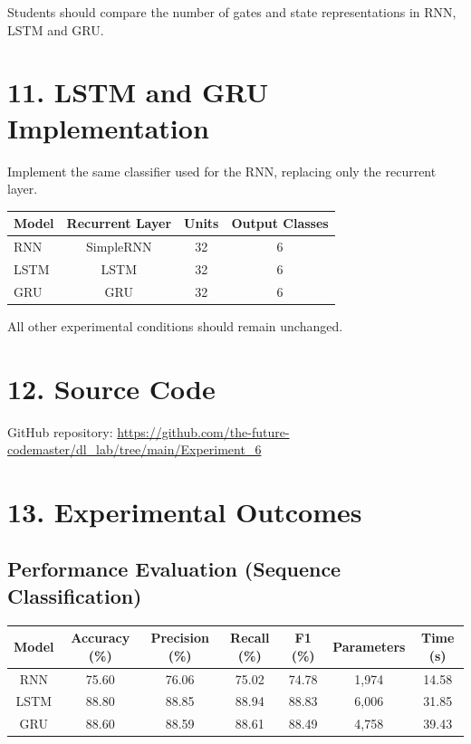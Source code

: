 \documentclass[10pt]{article}
\begin{document}
Students should compare the number of gates and state representations in
RNN, LSTM and GRU.

\section*{11. LSTM and GRU Implementation}

Implement the same classifier used for the RNN, replacing only the recurrent
layer.

\begin{center}
\begin{tabular}{|l|c|c|c|}
\hline
Model & Recurrent Layer & Units & Output Classes\\
\hline
RNN & SimpleRNN & 32 & 6\\
LSTM & LSTM & 32 & 6\\
GRU & GRU & 32 & 6\\
\hline
\end{tabular}
\end{center}

All other experimental conditions should remain unchanged.

\section*{12. Source Code}
GitHub repository: \href{https://github.com/the-future-codemaster/dl_lab/tree/main/Experiment_6}{https://github.com/the-future-codemaster/dl_lab/tree/main/Experiment_6}

\section*{13. Experimental Outcomes}

\subsection*{Performance Evaluation (Sequence Classification)}
\begin{table}[H]
    \centering
    \begin{tabular}{|c|c|c|c|c|c|c|}
        \hline
        \textbf{Model} & \textbf{Accuracy (\%)} & \textbf{Precision (\%)} & \textbf{Recall (\%)} & \textbf{F1 (\%)} & \textbf{Parameters} & \textbf{Time (s)} \\ \hline
        RNN & 75.60 & 76.06 & 75.02 & 74.78 & 1,974 & 14.58 \\ \hline
        LSTM & 88.80 & 88.85 & 88.94 & 88.83 & 6,006 & 31.85 \\ \hline
        GRU & 88.60 & 88.59 & 88.61 & 88.49 & 4,758 & 39.43 \\ \hline
    \end{tabular}
\end{table}
\end{document}
